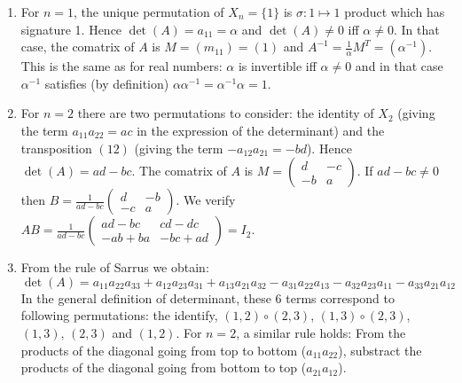 \begin{enumerate}
\item For $n=1$,
  the unique permutation of $X_n = \{ 1 \}$ is $\sigma: 1 \mapsto 1$ product
  which has signature 1. Hence $\det(A) = a_{11} = \alpha$ and
  $\det(A) \neq 0$ iff $\alpha \neq 0$. In that case, the comatrix of $A$
  is $M = (m_{11}) = (1)$ and $A^{-1} = \frac{1}{\alpha} M^T = {(\alpha^{-1})}$.
  This is the same as for real numbers:
  $\alpha$ is invertible iff $\alpha \neq 0$ and in that case $\alpha^{-1}$
  satisfies (by definition) $\alpha \alpha^{-1} = \alpha^{-1} \alpha = 1$.
\item  For $n=2$ there are two permutations to consider: the identity of $X_2$
  (giving the term $a_{11}a_{22}=ac$ in the expression of the determinant)
  and the transposition $(12)$ (giving the term $-a_{12}a_{21}=-bd$). Hence
  $\det(A) =  ad - bc$. The comatrix of $A$ is
  $M = \begin{pmatrix} d & -c \\ -b & a \end{pmatrix}$.
  If $ad - bc \neq 0$
  then $B = \frac{1}{ad - bc} \begin{pmatrix} d & -b \\ -c & a \end{pmatrix}$.
  We verify $AB = \frac{1}{ad - bc}
  \begin{pmatrix} ad - bc & cd - dc \\ -ab + ba & -bc + ad \end{pmatrix} = I_2$.
\item From the rule of Sarrus we obtain:
  $$\det(A) = a_{11}a_{22}a_{33}+a_{12}a_{23}a_{31}+a_{13}a_{21}a_{32}-a_{31}a_{22}a_{13}-a_{32}a_{23}a_{11}-a_{33}a_{21}a_{12}$$
  In the general definition of determinant, these 6 terms correspond
  to following permutations:
  the identify, $(1,2) \circ (2,3)$,
  $(1,3) \circ (2,3)$, $(1,3)$, $(2,3)$ and $(1,2)$.
  For $n=2$, a similar rule holds:
  From the products of the diagonal
  going from top to bottom ($a_{11}a_{22}$), substract the products of the
  diagonal going from bottom to top ($a_{21}a_{12}$).
\begin{center}
\end{center}

\end{enumerate}

